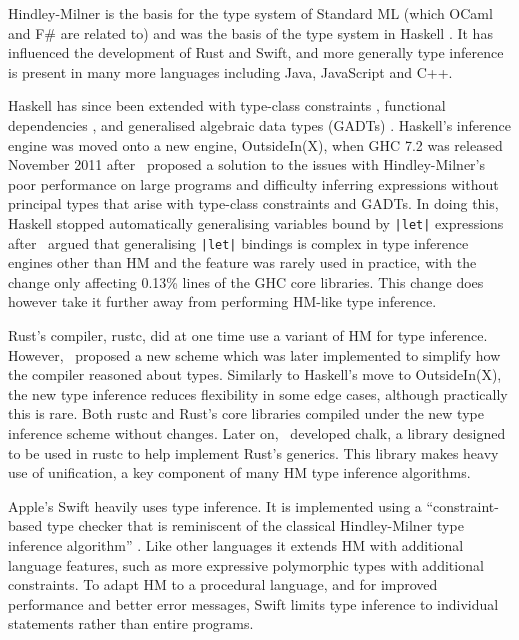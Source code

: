 \documentclass[a4paper,fleqn,twoside,12pt]{report}
\begin{document}
Hindley-Milner is the basis for the type system of Standard ML \citep{ref15} (which OCaml and F\# are related to) and was the basis of the type system in Haskell \citep{ref16}. It has influenced the development of Rust and Swift, and more generally type inference is present in many more languages including Java, JavaScript and C++.

Haskell has since been extended with type-class constraints \citep{ref17}, functional dependencies \citep{ref18}, and generalised algebraic data types (GADTs) \citep{ref19}. Haskell’s inference engine was moved onto a new engine, OutsideIn(X), when GHC 7.2 was released November 2011 after~\cite{ref20} proposed a solution to the issues with Hindley-Milner’s poor performance on large programs and difficulty inferring expressions without principal types that arise with type-class constraints and GADTs. In doing this, Haskell stopped automatically generalising variables bound by \texttt{|let|} expressions after~\cite{ref21} argued that generalising \texttt{|let|} bindings is complex in type inference engines other than HM and the feature was rarely used in practice, with the change only affecting 0.13\% lines of the GHC core libraries. This change does however take it further away from performing HM-like type inference.

Rust’s compiler, rustc, did at one time use a variant of HM for type inference. However,~\cite{ref22} proposed a new scheme which was later implemented to simplify how the compiler reasoned about types. Similarly to Haskell’s move to OutsideIn(X), the new type inference reduces flexibility in some edge cases, although practically this is rare. Both rustc and Rust’s core libraries compiled under the new type inference scheme without changes. Later on,~\cite{ref23} developed chalk, a library designed to be used in rustc to help implement Rust’s generics. This library makes heavy use of unification, a key component of many HM type inference algorithms.

Apple’s Swift heavily uses type inference. It is implemented using a “constraint-based type checker that is reminiscent of the classical Hindley-Milner type inference algorithm” \citep{ref24}. Like other languages it extends HM with additional language features, such as more expressive polymorphic types with additional constraints. To adapt HM to a procedural language, and for improved performance and better error messages, Swift limits type inference to individual statements rather than entire programs.
\end{document}
